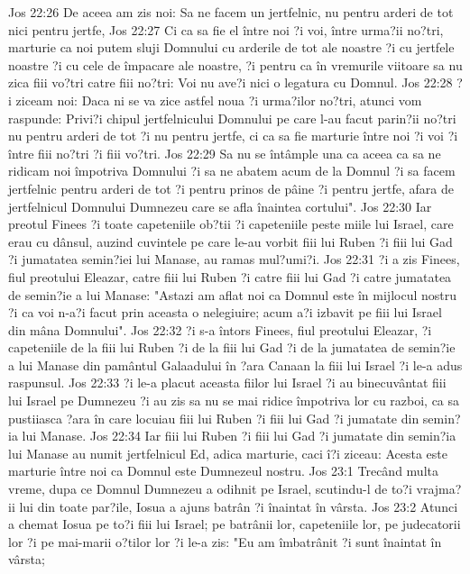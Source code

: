 Jos 22:26  De aceea am zis noi: Sa ne facem un jertfelnic, nu pentru arderi de tot nici pentru jertfe,
Jos 22:27  Ci ca sa fie el între noi ?i voi, între urma?ii no?tri, marturie ca noi putem sluji Domnului cu arderile de tot ale noastre ?i cu jertfele noastre ?i cu cele de împacare ale noastre, ?i pentru ca în vremurile viitoare sa nu zica fiii vo?tri catre fiii no?tri: Voi nu ave?i nici o legatura cu Domnul.
Jos 22:28  ?i ziceam noi: Daca ni se va zice astfel noua ?i urma?ilor no?tri, atunci vom raspunde: Privi?i chipul jertfelnicului Domnului pe care l-au facut parin?ii no?tri nu pentru arderi de tot ?i nu pentru jertfe, ci ca sa fie marturie între noi ?i voi ?i între fiii no?tri ?i fiii vo?tri.
Jos 22:29  Sa nu se întâmple una ca aceea ca sa ne ridicam noi împotriva Domnului ?i sa ne abatem acum de la Domnul ?i sa facem jertfelnic pentru arderi de tot ?i pentru prinos de pâine ?i pentru jertfe, afara de jertfelnicul Domnului Dumnezeu care se afla înaintea cortului".
Jos 22:30  Iar preotul Finees ?i toate capeteniile ob?tii ?i capeteniile peste miile lui Israel, care erau cu dânsul, auzind cuvintele pe care le-au vorbit fiii lui Ruben ?i fiii lui Gad ?i jumatatea semin?iei lui Manase, au ramas mul?umi?i.
Jos 22:31  ?i a zis Finees, fiul preotului Eleazar, catre fiii lui Ruben ?i catre fiii lui Gad ?i catre jumatatea de semin?ie a lui Manase: "Astazi am aflat noi ca Domnul este în mijlocul nostru ?i ca voi n-a?i facut prin aceasta o nelegiuire; acum a?i izbavit pe fiii lui Israel din mâna Domnului".
Jos 22:32  ?i s-a întors Finees, fiul preotului Eleazar, ?i capeteniile de la fiii lui Ruben ?i de la fiii lui Gad ?i de la jumatatea de semin?ie a lui Manase din pamântul Galaadului în ?ara Canaan la fiii lui Israel ?i le-a adus raspunsul.
Jos 22:33  ?i le-a placut aceasta fiilor lui Israel ?i au binecuvântat fiii lui Israel pe Dumnezeu ?i au zis sa nu se mai ridice împotriva lor cu razboi, ca sa pustiiasca ?ara în care locuiau fiii lui Ruben ?i fiii lui Gad ?i jumatate din semin?ia lui Manase.
Jos 22:34  Iar fiii lui Ruben ?i fiii lui Gad ?i jumatate din semin?ia lui Manase au numit jertfelnicul Ed, adica marturie, caci î?i ziceau: Acesta este marturie între noi ca Domnul este Dumnezeul nostru.
Jos 23:1  Trecând multa vreme, dupa ce Domnul Dumnezeu a odihnit pe Israel, scutindu-l de to?i vrajma?ii lui din toate par?ile, Iosua a ajuns batrân ?i înaintat în vârsta.
Jos 23:2  Atunci a chemat Iosua pe to?i fiii lui Israel; pe batrânii lor, capeteniile lor, pe judecatorii lor ?i pe mai-marii o?tilor lor ?i le-a zis: "Eu am îmbatrânit ?i sunt înaintat în vârsta;
